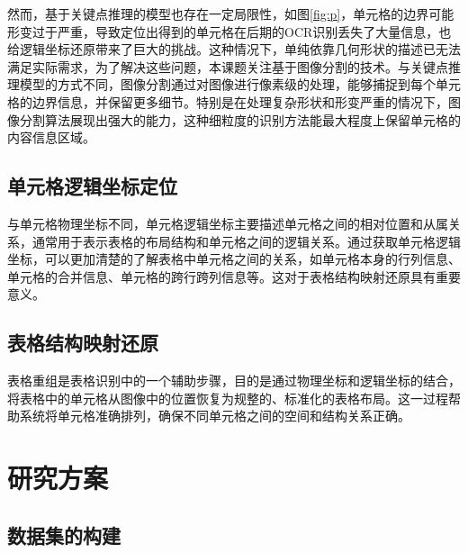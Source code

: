 \documentclass[UTF8,12pt, AutoFakeBold,fontset = founder]{ctexart}
\begin{document}
然而，基于关键点推理的模型也存在一定局限性，如图\ref{fig:p}，单元格的边界可能形变过于严重，导致定位出得到的单元格在后期的OCR识别丢失了大量信息，也给逻辑坐标还原带来了巨大的挑战。这种情况下，单纯依靠几何形状的描述已无法满足实际需求，为了解决这些问题，本课题关注基于图像分割的技术。与关键点推理模型的方式不同，图像分割通过对图像进行像素级的处理，能够捕捉到每个单元格的边界信息，并保留更多细节。特别是在处理复杂形状和形变严重的情况下，图像分割算法展现出强大的能力，这种细粒度的识别方法能最大程度上保留单元格的内容信息区域。

\subsection{单元格逻辑坐标定位}

与单元格物理坐标不同，单元格逻辑坐标主要描述单元格之间的相对位置和从属关系，通常用于表示表格的布局结构和单元格之间的逻辑关系。通过获取单元格逻辑坐标，可以更加清楚的了解表格中单元格之间的关系，如单元格本身的行列信息、单元格的合并信息、单元格的跨行跨列信息等。这对于表格结构映射还原具有重要意义。

\subsection{表格结构映射还原}

表格重组是表格识别中的一个辅助步骤，目的是通过物理坐标和逻辑坐标的结合，将表格中的单元格从图像中的位置恢复为规整的、标准化的表格布局。这一过程帮助系统将单元格准确排列，确保不同单元格之间的空间和结构关系正确。

\section{研究方案}
\subsection{数据集的构建}
\end{document}
